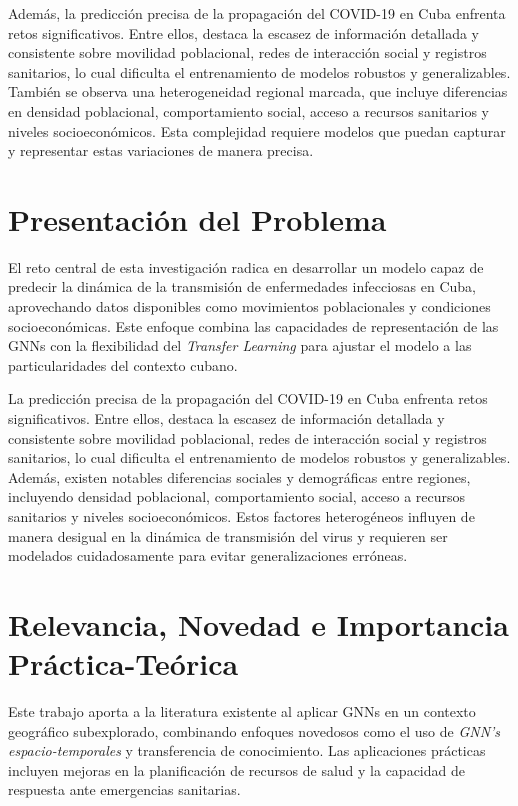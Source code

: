 Además, la predicción precisa de la propagación del COVID-19 en Cuba enfrenta retos significativos. Entre ellos, destaca la escasez de información detallada y consistente sobre movilidad poblacional, redes de interacción social y registros sanitarios, lo cual dificulta el entrenamiento de modelos robustos y generalizables. También se observa una heterogeneidad regional marcada, que incluye diferencias en densidad poblacional, comportamiento social, acceso a recursos sanitarios y niveles socioeconómicos. Esta complejidad requiere modelos que puedan capturar y representar estas variaciones de manera precisa.

\section*{Presentación del Problema}
El reto central de esta investigación radica en desarrollar un modelo capaz de predecir la dinámica de la transmisión de enfermedades infecciosas en Cuba, aprovechando datos disponibles como movimientos poblacionales y condiciones socioeconómicas. Este enfoque combina las capacidades de representación de las GNNs con la flexibilidad del \textit{Transfer Learning} para ajustar el modelo a las particularidades del contexto cubano.

La predicción precisa de la propagación del COVID-19 en Cuba enfrenta retos significativos. Entre ellos, destaca la escasez de información detallada y consistente sobre movilidad poblacional, redes de interacción social y registros sanitarios, lo cual dificulta el entrenamiento de modelos robustos y generalizables. Además, existen notables diferencias sociales y demográficas entre regiones, incluyendo densidad poblacional, comportamiento social, acceso a recursos sanitarios y niveles socioeconómicos. Estos factores heterogéneos influyen de manera desigual en la dinámica de transmisión del virus y requieren ser modelados cuidadosamente para evitar generalizaciones erróneas.

\section*{Relevancia, Novedad e Importancia Práctica-Teórica}
Este trabajo aporta a la literatura existente al aplicar GNNs en un contexto geográfico subexplorado, combinando enfoques novedosos como el uso de \textit{GNN's espacio-temporales} y transferencia de conocimiento. Las aplicaciones prácticas incluyen mejoras en la planificación de recursos de salud y la capacidad de respuesta ante emergencias sanitarias.

